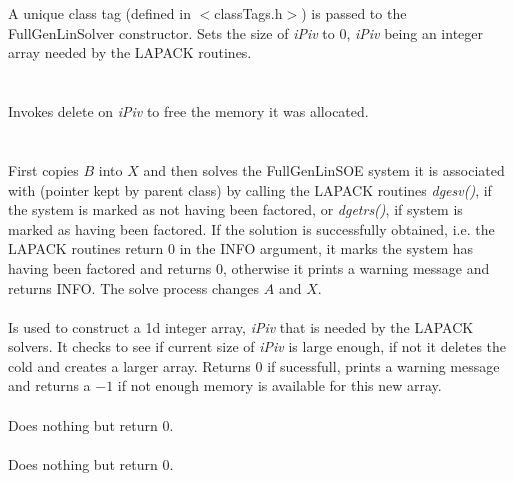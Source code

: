   \\
  \\
A unique class tag (defined in $<$classTags.h$>$) is passed to the
FullGenLinSolver constructor. Sets the size of {\em iPiv} to $0$, {\em
iPiv} being an integer array needed by the LAPACK routines. \\

 \\
\\ 
Invokes delete on {\em iPiv} to free the memory it was allocated. \\


  \\
 \\
First copies $B$ into $X$ and then solves the FullGenLinSOE system 
it is associated with (pointer kept by parent class) by calling the LAPACK 
routines {\em dgesv()}, if the system is marked as not having been factored,
or {\em dgetrs()}, if system is marked as having been factored. If the
solution is successfully obtained, i.e. the LAPACK routines return $0$
in the INFO argument, it marks the system has having been
factored and returns $0$, otherwise it prints a warning message and
returns INFO. The solve process changes $A$ and $X$. \\   

 \\
Is used to construct a 1d integer array, {\em iPiv} that is needed by
the LAPACK solvers. It checks to see if current size of {\em iPiv} is
large enough, if not it deletes the cold and creates a larger
array. Returns $0$ if sucessfull, prints a warning message and returns
a $-1$ if not enough memory is available for this new array. \\


 \\ 
Does nothing but return $0$. \\

 \\ 
Does nothing but return $0$. \\




